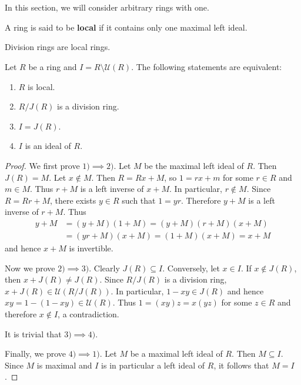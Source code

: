 \chapter{}
\label{09}


In this section, we will consider arbitrary rings with one. 

\begin{definition}
    A ring is said to be \textbf{local} if it contains only one maximal left ideal. 
\end{definition}

Division rings are local rings. 


\begin{theorem}
\label{thm:local}
    Let $R$ be a ring and $I=R\setminus\mathcal{U}(R)$. The following
    statements are equivalent:
    \begin{enumerate}
        \item $R$ is local.
        \item $R/J(R)$ is a division ring.
        \item $I=J(R)$.
        \item $I$ is an ideal of $R$.
    \end{enumerate}
\end{theorem}

\begin{proof}
    We first prove $1)\implies2)$. Let $M$ be the maximal left ideal of $R$. Then $J(R)=M$. 
    Let $x\not\in M$. Then $R=Rx+M$, so $1=rx+m$ for some $r\in R$ and $m\in M$. Thus  
    $r+M$ is a left inverse of $x+M$. In particular, 
    $r\not\in M$. Since $R=Rr+M$, there exists $y\in R$ such that $1=yr$. Therefore
    $y+M$ is a left inverse of $r+M$. Thus 
    \begin{align*}
    y+M&=(y+M)(1+M)=(y+M)(r+M)(x+M)\\
    &=(yr+M)(x+M)=(1+M)(x+M)=x+M
    \end{align*}
    and hence $x+M$ is invertible. 

    Now we prove $2)\implies3)$. Clearly $J(R)\subseteq I$. 
    Conversely, let $x\in I$. If $x\not\in J(R)$, then
    $x+J(R)\ne J(R)$. Since $R/J(R)$ is a division ring, 
    $x+J(R)\in\mathcal{U}(R/J(R))$. In particular, $1-xy\in J(R)$ and hence 
    $xy=1-(1-xy)\in\mathcal{U}(R)$. Thus $1=(xy)z=x(yz)$ for some $z\in R$ and therefore $x\not\in I$, a contradiction. 
    
    It is trivial that $3)\implies4)$. 

    Finally, we prove $4)\implies 1)$. 
    Let $M$ be a maximal left ideal of $R$. Then $M\subseteq I$. Since $M$ 
    is maximal and $I$ is in particular a left ideal of $R$, 
    it follows that $M=I$. 
\end{proof}

